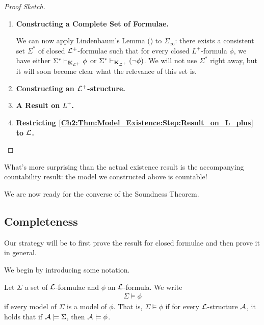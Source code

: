 \begin{proof}[Proof Sketch]
\begin{enumerate}[label = \underline{\textbf{Step \arabic*.}}]
        \item \textbf{Constructing a Complete Set of Formulae.}
        
        We can now apply Lindenbaum's Lemma () to $\Sigma_{\infty}$: there exists a consistent set $\Sigma^*$ of closed $\mathcal{L}^+$-formulae such that for every closed $L^+$-formula $\phi$, we have either $\Sigma^* \vdash_{\mathbf{K}_{\mathcal{L}^+}} \phi$ or $\Sigma^* \vdash_{\mathbf{K}_{\mathcal{L}^+}} \left( \neg \phi \right)$. We will not use $\Sigma^*$ right away, but it will soon become clear what the relevance of this set is.
        
        \item \textbf{Constructing an $\mathcal{L}^+$-structure.}
        
        \sorry
        
        \item\label{Ch2:Thm:Model_Existence:Step:Result_on_L_plus} \textbf{A Result on $L^+$.}
        
        \sorry

        \item \textbf{Restricting \ref{Ch2:Thm:Model_Existence:Step:Result_on_L_plus} to $\mathcal{L}$.}
        
        \sorry
    \end{enumerate}
\end{proof}

What's more surprising than the actual existence result is the accompanying countability result: the model we constructed above is countable!

We are now ready for the converse of the Soundness Theorem.

\subsection{Completeness}

Our strategy will be to first prove the result for closed formulae and then prove it in general.

We begin by introducing some notation.

\begin{boxconvention}
    Let $\Sigma$ a set of $\mathcal{L}$-formulae and $\phi$ an $\mathcal{L}$-formula. We write
    \begin{align*}
        \Sigma \models \phi
    \end{align*}
    if every model of $\Sigma$ is a model of $\phi$. That is, $\Sigma \models \phi$ if for every $\mathcal{L}$-structure $\mathcal{A}$, it holds that if $\mathcal{A} \models \Sigma$, then $\mathcal{A} \models \phi$.
\end{boxconvention}

